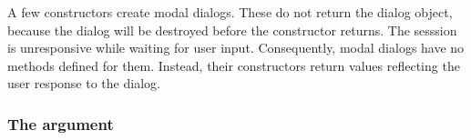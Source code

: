 
A few constructors create modal dialogs. These do not return the
dialog object, because the dialog will be destroyed before the
constructor returns. The \R\/ sesssion is unresponsive while waiting
for user input.  Consequently, modal dialogs have no methods defined
for them.  Instead, their constructors return values reflecting the
user response to the dialog.

\subsubsection{The  argument}

